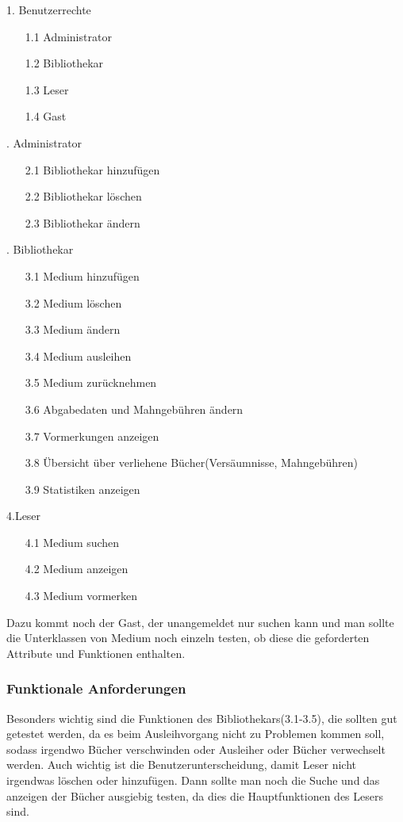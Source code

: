 \documentclass[fontsize=12pt,paper=a4,twoside]{scrartcl}
\begin{document}
1. Benutzerrechte\\
\begin{itemize}
\item[1.1]Administrator 
\item[1.2]Bibliothekar 
\item[1.3]Leser 
\item[1.4]Gast
\end{itemize}
. Administrator\\
\begin{itemize}
\item[2.1]Bibliothekar hinzufügen
\item[2.2]Bibliothekar löschen
\item[2.3]Bibliothekar ändern
\end{itemize}
. Bibliothekar\\
\begin{itemize}
\item[3.1]Medium hinzufügen
\item[3.2]Medium löschen
\item[3.3]Medium ändern
\item[3.4]Medium ausleihen
\item[3.5]Medium zurücknehmen
\item[3.6]Abgabedaten und Mahngebühren ändern
\item[3.7]Vormerkungen anzeigen
\item[3.8]Übersicht über verliehene Bücher(Versäumnisse, Mahngebühren)
\item[3.9]Statistiken anzeigen
\end{itemize}
\bigskip
4.Leser\\
\begin{itemize}
\item[4.1]Medium suchen
\item[4.2]Medium anzeigen
\item[4.3]Medium vormerken
\end{itemize}
\bigskip
Dazu kommt noch der Gast, der unangemeldet nur suchen kann und man sollte die Unterklassen von Medium noch einzeln testen, ob diese die geforderten Attribute und Funktionen enthalten.

\subsubsection{Funktionale Anforderungen} 

Besonders wichtig sind die Funktionen des Bibliothekars(3.1-3.5), die sollten gut getestet werden, da es beim Ausleihvorgang nicht zu Problemen kommen soll, sodass irgendwo Bücher verschwinden oder Ausleiher oder Bücher verwechselt werden. Auch wichtig ist die Benutzerunterscheidung, damit Leser nicht irgendwas löschen oder hinzufügen. Dann sollte man noch die Suche und das anzeigen der Bücher ausgiebig testen, da dies die Hauptfunktionen des Lesers sind.
\end{document}
